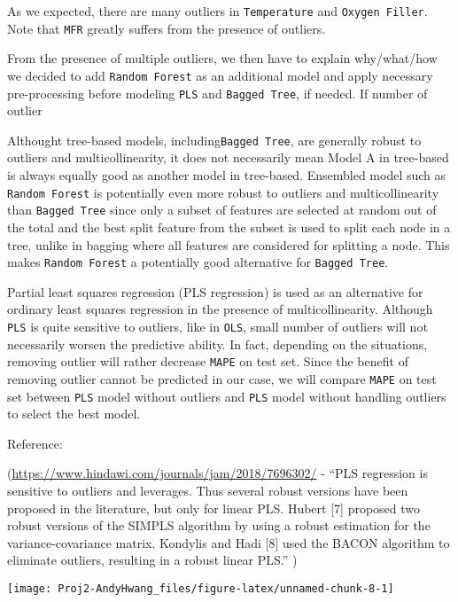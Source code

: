 \documentclass[]{report}
\begin{document}
As we expected, there are many outliers in \texttt{Temperature} and
\texttt{Oxygen\ Filler}. Note that \texttt{MFR} greatly suffers from the
presence of outliers.

From the presence of multiple outliers, we then have to explain
why/what/how we decided to add \texttt{Random\ Forest} as an additional
model and apply necessary pre-processing before modeling \texttt{PLS}
and \texttt{Bagged\ Tree}, if needed. If number of outlier

Althought tree-based models, including\texttt{Bagged\ Tree}, are
generally robust to outliers and multicollinearity, it does not
necessarily mean Model A in tree-based is always equally good as another
model in tree-based. Ensembled model such as \texttt{Random\ Forest} is
potentially even more robust to outliers and multicollinearity than
\texttt{Bagged\ Tree} since only a subset of features are selected at
random out of the total and the best split feature from the subset is
used to split each node in a tree, unlike in bagging where all features
are considered for splitting a node. This makes \texttt{Random\ Forest}
a potentially good alternative for \texttt{Bagged\ Tree}.

Partial least squares regression (PLS regression) is used as an
alternative for ordinary least squares regression in the presence of
multicollinearity. Although \texttt{PLS} is quite sensitive to outliers,
like in \texttt{OLS}, small number of outliers will not necessarily
worsen the predictive ability. In fact, depending on the situations,
removing outlier will rather decrease \texttt{MAPE} on test set. Since
the benefit of removing outlier cannot be predicted in our case, we will
compare \texttt{MAPE} on test set between \texttt{PLS} model without
outliers and \texttt{PLS} model without handling outliers to select the
best model.

Reference:

(\url{https://www.hindawi.com/journals/jam/2018/7696302/} - ``PLS
regression is sensitive to outliers and leverages. Thus several robust
versions have been proposed in the literature, but only for linear PLS.
Hubert {[}7{]} proposed two robust versions of the SIMPLS algorithm by
using a robust estimation for the variance-covariance matrix. Kondylis
and Hadi {[}8{]} used the BACON algorithm to eliminate outliers,
resulting in a robust linear PLS.'' )

\begin{center}\texttt{[image: Proj2-AndyHwang\_files/figure-latex/unnamed-chunk-8-1]} \end{center}
\end{document}
